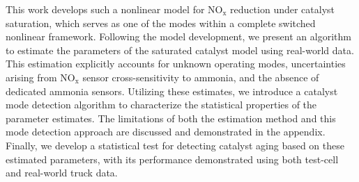 \documentclass[subscriptcorrection,upint,varvw,barcolor=Goldenrod3,mathalfa=cal=euler,balance,hyphenate,french,pdf-a]{asmejour}
\newcommand{\nox}{\text{NO}_{\text{x}}}
\begin{document}
This work develops such a nonlinear model for $\nox$ reduction under catalyst saturation, which serves as one of
the modes within a complete switched nonlinear framework. Following the model development, we present an algorithm to
estimate the parameters of the saturated catalyst model using real-world data. This estimation explicitly accounts for
unknown operating modes, uncertainties arising from $\nox$ sensor cross-sensitivity to ammonia, and the absence of
dedicated ammonia sensors. Utilizing these estimates, we introduce a catalyst mode detection algorithm to characterize
the statistical properties of the parameter estimates. The limitations of both the estimation method and this mode
detection approach are discussed and demonstrated in the appendix. Finally, we develop a statistical test for detecting
catalyst aging based on these estimated parameters, with its performance demonstrated using both test-cell and
real-world truck data.
\end{document}
